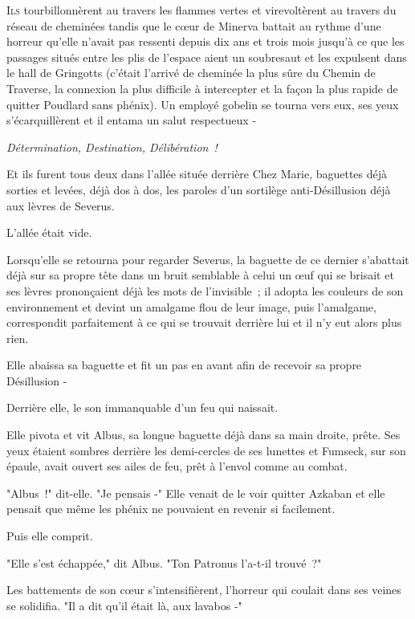 
\lettrine{I}{ls} tourbillonnèrent au travers les flammes vertes et virevoltèrent au travers du réseau de cheminées tandis que le cœur de Minerva battait au rythme d'une horreur qu'elle n'avait pas ressenti depuis dix ans et trois mois jusqu'à ce que les passages situés entre les plis de l'espace aient un soubresaut et les expulsent dans le hall de Gringotts (c'était l'arrivé de cheminée la plus sûre du Chemin de Traverse, la connexion la plus difficile à intercepter et la façon la plus rapide de quitter Poudlard sans phénix). Un employé gobelin se tourna vers eux, ses yeux s'écarquillèrent et il entama un salut respectueux -

\emph{Détermination, Destination, Délibération~!}

Et ils furent tous deux dans l'allée située derrière Chez Marie, baguettes déjà sorties et levées, déjà dos à dos, les paroles d'un sortilège anti-Désillusion déjà aux lèvres de Severus.

L'allée était vide.

Lorsqu'elle se retourna pour regarder Severus, la baguette de ce dernier s'abattait déjà sur sa propre tête dans un bruit semblable à celui un œuf qui se brisait et ses lèvres prononçaient déjà les mots de l'invisible~; il adopta les couleurs de son environnement et devint un amalgame flou de leur image, puis l'amalgame, correspondit parfaitement à ce qui se trouvait derrière lui et il n'y eut alors plus rien.

Elle abaissa sa baguette et fit un pas en avant afin de recevoir sa propre Désillusion -

Derrière elle, le son immanquable d'un feu qui naissait.

Elle pivota et vit Albus, sa longue baguette déjà dans sa main droite, prête. Ses yeux étaient sombres derrière les demi-cercles de ses lunettes et Fumseck, sur son épaule, avait ouvert ses ailes de feu, prêt à l'envol comme au combat.

"Albus~!" dit-elle. "Je pensais -" Elle venait de le voir quitter Azkaban et elle pensait que même les phénix ne pouvaient en revenir si facilement.

Puis elle comprit.

"Elle s'est échappée," dit Albus. "Ton Patronus l'a-t-il trouvé~?"

Les battements de son cœur s'intensifièrent, l'horreur qui coulait dans ses veines se solidifia. "Il a dit qu'il était là, aux lavabos -"

